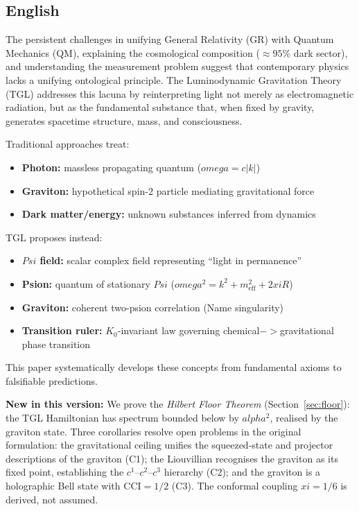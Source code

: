 \documentclass[12pt,a4paper]{article}
\def\Psi{Psi}%
\def\to{ -> }%
\def\alpha{alpha}%
\def\xi{xi}%
\def\omega{omega}%
\begin{document}
\subsection{English}

The persistent challenges in unifying General Relativity (GR) with Quantum Mechanics (QM), explaining the cosmological composition ($\approx 95\%$ dark sector), and understanding the measurement problem suggest that contemporary physics lacks a unifying ontological principle. The Luminodynamic Gravitation Theory (TGL) addresses this lacuna by reinterpreting light not merely as electromagnetic radiation, but as the fundamental substance that, when fixed by gravity, generates spacetime structure, mass, and consciousness.

Traditional approaches treat:
\begin{itemize}
    \item \textbf{Photon:} massless propagating quantum ($\omega = c|k|$)
    \item \textbf{Graviton:} hypothetical spin-2 particle mediating gravitational force
    \item \textbf{Dark matter/energy:} unknown substances inferred from dynamics
\end{itemize}

TGL proposes instead:
\begin{itemize}
    \item \textbf{$\Psi$ field:} scalar complex field representing ``light in permanence''
    \item \textbf{Psion:} quantum of stationary $\Psi$ ($\omega^2 = k^2 + m_{\text{eff}}^2 + 2\xi R$)
    \item \textbf{Graviton:} coherent two-psion correlation (Name singularity)
    \item \textbf{Transition ruler:} $K_0$-invariant law governing chemical$\to$gravitational phase transition
\end{itemize}

This paper systematically develops these concepts from fundamental axioms to falsifiable predictions.

\textbf{New in this version:} We prove the \emph{Hilbert Floor Theorem} (Section~\ref{sec:floor}): the TGL Hamiltonian has spectrum bounded below by $\alpha^2$, realised by the graviton state. Three corollaries resolve open problems in the original formulation: the gravitational ceiling unifies the squeezed-state and projector descriptions of the graviton (C1); the Liouvillian recognises the graviton as its fixed point, establishing the $c^1$--$c^2$--$c^3$ hierarchy (C2); and the graviton is a holographic Bell state with $\mathrm{CCI}=1/2$ (C3). The conformal coupling $\xi = 1/6$ is derived, not assumed.
\end{document}

